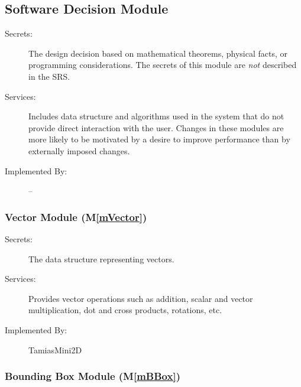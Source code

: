 \documentclass[12pt]{article}
\newcommand{\mref}[1]{M\ref{#1}}
\newcommand{\authornote}[3]{\textcolor{#1}{[#3 ---#2]}}
\newcommand{\authornote}[3]{}
\newcommand{\olu}[1]{\authornote{red}{OO}{#1}}
\begin{document}

\subsection{Software Decision Module}

\begin{description}
\item[Secrets:] The design decision based on mathematical theorems, physical
  facts, or programming considerations. The secrets of this module are
  \emph{not} described in the SRS.
\item[Services:] Includes data structure and algorithms used in the system that do not provide direct interaction with the user. 
  Changes in these modules are more likely to be motivated by a desire to
  improve performance than by externally imposed changes.
\item[Implemented By:] --
\end{description}

\subsubsection{Vector Module (\mref{mVector})}
	
\begin{description}
	\item[Secrets:] The data structure representing vectors.
	\item[Services:] Provides vector operations such as addition, scalar and vector multiplication, dot and cross products, rotations, etc.
	\item[Implemented By:] TamiasMini2D
\end{description}

\subsubsection{Bounding Box Module (\mref{mBBox})}
\end{document}
